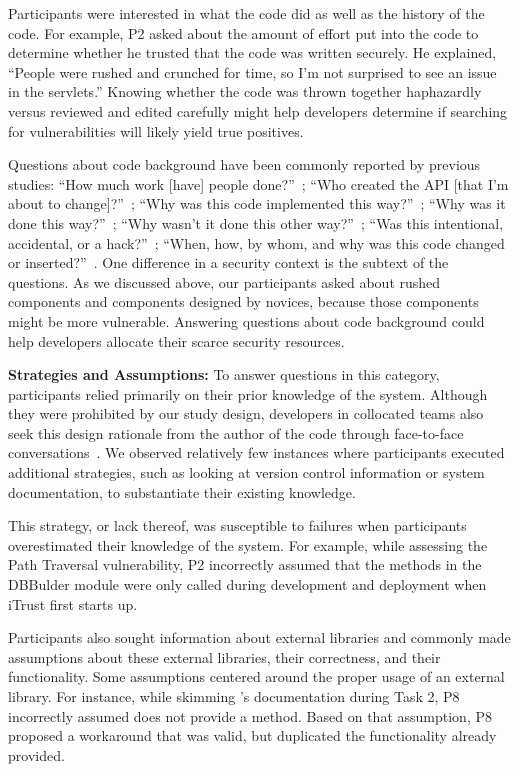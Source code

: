 \documentclass[10pt,journal,compsoc]{IEEEtran}
\begin{document}
Participants were interested in what the code did as well as the history of the code.
For example, P2 asked about the amount of effort put into the code to determine whether he trusted that the code was written securely.
He explained, ``People were rushed and crunched for time, so I'm not surprised to see an issue in the servlets.'' 
Knowing whether the code was thrown together haphazardly versus reviewed and edited carefully might help developers determine if searching for vulnerabilities will likely yield true positives.

Questions about code background have been commonly reported by previous studies:
``How much work [have] people done?''~\cite{fritz2010using};
``Who created the API [that I'm about to change]?''~\cite{fritz2010using};
``Why was this code implemented this way?''~\cite{Ko:2007:information};
``Why was it done this way?''~\cite{latoza2010hard};
``Why wasn't it done this other way?''~\cite{latoza2010hard};
``Was this intentional, accidental, or a hack?''~\cite{latoza2010hard};
``When, how, by whom, and why was this code changed or inserted?''~\cite{latoza2010hard}.
One difference in a security context is the subtext of the questions.
As we discussed above, our participants asked about rushed components and components designed by novices, because those components might be more vulnerable.
Answering questions about code background could help developers allocate their scarce security resources.


\textbf{Strategies and Assumptions:}
To answer questions in this category, participants relied primarily on their prior knowledge of the system.
Although they were prohibited by our study design, developers in collocated teams also seek this design rationale from the author of the code through face-to-face conversations~\cite{Ko:2007:information}.
We observed relatively few instances where participants executed additional strategies, such as looking at version control information or system documentation, to substantiate their existing knowledge. 

This strategy, or lack thereof, was susceptible to failures when participants overestimated their knowledge of the system.
For example, while assessing the Path Traversal vulnerability, P2 incorrectly assumed that the methods in the DBBulder module were only called during development and deployment when iTrust first starts up.

Participants also sought information about external libraries and commonly made assumptions about these external libraries, their correctness, and their functionality.
Some assumptions centered around the proper usage of an external library. 
For instance, while skimming 's documentation during Task 2, P8 incorrectly assumed  does not provide a  method.
Based on that assumption, P8 proposed a workaround that was valid, but duplicated the functionality  already provided.
\end{document}

